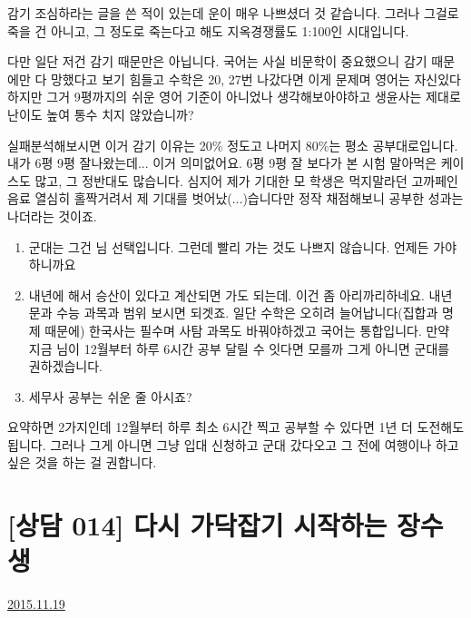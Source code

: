 감기 조심하라는 글을 쓴 적이 있는데 운이 매우 나쁘셨더 것 같습니다.
그러나 그걸로 죽을 건 아니고, 그 정도로 죽는다고 해도 지옥경쟁률도 1:100인 시대입니다.
\vspace{5mm}

다만 일단 저건 감기 때문만은 아닙니다. 국어는 사실 비문학이 중요했으니 감기 때문에만 다 망했다고 보기 힘들고
수학은 20, 27번 나갔다면 이게 문제며
영어는 자신있다 하지만 그거 9평까지의 쉬운 영어 기준이 아니었나 생각해보아야하고
생윤사는 제대로 난이도 높여 통수 치지 않았습니까?
\vspace{5mm}

실패분석해보시면 이거 감기 이유는 20$\%$ 정도고 나머지 80$\%$는 평소 공부대로입니다.
내가 6평 9평 잘나왔는데... 이거 의미없어요. 6평 9평 잘 보다가 본 시험 말아먹은 케이스도 많고, 그 정반대도 많습니다.
심지어 제가 기대한 모 학생은 먹지말라던 고까페인 음료 열심히 홀짝거려서 제 기대를 벗어났(...)습니다만
정작 채점해보니 공부한 성과는 나더라는 것이죠.
\vspace{5mm}

\begin{enumerate}
    \item 군대는 그건 님 선택입니다. 그런데 빨리 가는 것도 나쁘지 않습니다. 언제든 가야하니까요
    \vspace{5mm}
    
    \item 내년에 해서 승산이 있다고 계산되면 가도 되는데. 이건 좀 아리까리하네요.
    내년 문과 수능 과목과 범위 보시면 되겟죠.
    일단 수학은 오히려 늘어납니다(집합과 명제 때문에) 한국사는 필수며
    사탐 과목도 바꿔야하겠고 국어는 통합입니다.
    만약 지금 님이 12월부터 하루 6시간 공부 달릴 수 잇다면 모를까 그게 아니면 군대를 권하겠습니다.
    \vspace{5mm}
    
    \item 세무사 공부는 쉬운 줄 아시죠?
    \vspace{5mm}
\end{enumerate}

요약하면 2가지인데
12월부터 하루 최소 6시간 찍고 공부할 수 있다면 1년 더 도전해도 됩니다.
그러나 그게 아니면 그냥 입대 신청하고 군대 갔다오고 그 전에 여행이나 하고싶은 것을 하는 걸 권합니다.
\vspace{5mm}





\section{[상담 014] 다시 가닥잡기 시작하는 장수생}
\href{https://www.kockoc.com/Apoc/501589}{2015.11.19}

